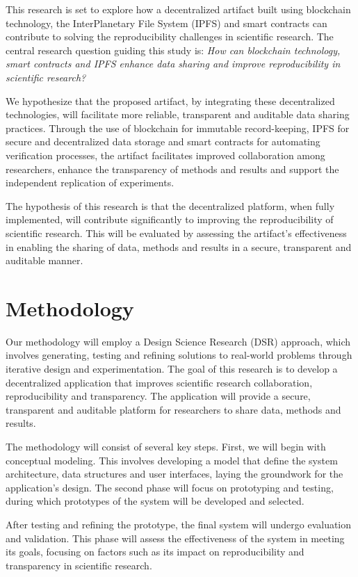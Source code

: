 \documentclass{article}
\begin{document}
This research is set to explore how a decentralized artifact built using blockchain technology, the  InterPlanetary File System (IPFS) and smart contracts can contribute to solving the reproducibility challenges in scientific research. The central research question guiding this study is: \textit{How can blockchain technology, smart contracts and IPFS enhance data sharing and improve reproducibility in scientific research?}

We hypothesize that the proposed artifact, by integrating these decentralized technologies, will facilitate more reliable, transparent and auditable data sharing practices. Through the use of blockchain for immutable record-keeping, IPFS for secure and decentralized data storage and smart contracts for automating verification processes, the artifact facilitates improved collaboration among researchers, enhance the transparency of methods and results and support the independent replication of experiments.

The hypothesis of this research is that the decentralized platform, when fully implemented, will contribute significantly to improving the reproducibility of scientific research. This will be evaluated by assessing the artifact’s effectiveness in enabling the sharing of data, methods and results in a secure, transparent and auditable manner.

\section{Methodology}

Our methodology will employ a Design Science Research (DSR) \cite{hevner2004design}approach, which involves generating, testing and refining solutions to real-world problems through iterative design and experimentation. The goal of this research is to develop a decentralized application that improves scientific research collaboration, reproducibility and transparency. The application will provide a secure, transparent and auditable platform for researchers to share data, methods and results.

The methodology will consist of several key steps. First, we will begin with conceptual modeling. This involves developing a model that define the system architecture, data structures and user interfaces, laying the groundwork for the application’s design. The second phase will focus on prototyping and testing, during which prototypes of the system will be developed and selected.

After testing and refining the prototype, the final system will undergo evaluation and validation. This phase will assess the effectiveness of the system in meeting its goals, focusing on factors such as its impact on reproducibility and transparency in scientific research.
\end{document}
